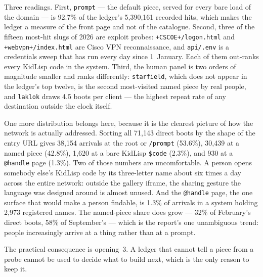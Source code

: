 \documentclass[10pt,letterpaper,twocolumn]{article}
\begin{document}
Three readings. First, \texttt{prompt} --- the default piece, served for
every bare load of the domain --- is 92.7\% of the ledger's 5,390,161
recorded hits, which makes the ledger a measure of the front page and
not of the catalogue. Second, three of the fifteen most-hit slugs of
2026 are exploit probes: \texttt{+CSCOE+/logon.html} and
\texttt{+webvpn+/index.html} are Cisco VPN reconnaissance, and
\texttt{api/.env} is a credentials sweep that has run every day since
1~January. Each of them out-ranks every KidLisp code in the system.
Third, the human panel is two orders of magnitude smaller and ranks
differently: \texttt{starfield}, which does not appear in the ledger's
top twelve, is the second most-visited named piece by real people, and
\texttt{laklok} draws 4.5 boots per client --- the highest repeat rate of
any destination outside the clock itself.

One more distribution belongs here, because it is the clearest picture
of how the network is actually addressed. Sorting all
71,143 direct boots by the shape of the entry URL gives 38,154
arrivals at the root or \texttt{/prompt} (53.6\%), 30,439 at a named
piece (42.8\%), 1,620 at a bare KidLisp \texttt{\$code} (2.3\%), and
930 at a \texttt{@handle} page (1.3\%). Two of those numbers are
uncomfortable. A person opens somebody else's KidLisp code by its
three-letter name about six times a day across the entire network:
outside the gallery iframe, the sharing gesture the language was
designed around is almost unused. And the \texttt{@handle} page, the
one surface that would make a person findable, is 1.3\% of arrivals in
a system holding 2,973 registered names. The named-piece share does
grow --- 32\% of February's direct boots, 58\% of September's --- which
is the report's one unambiguous trend: people increasingly arrive at a
thing rather than at a prompt.

The practical consequence is opening~3. A ledger that cannot tell a
piece from a probe cannot be used to decide what to build next, which
is the only reason to keep it.


\setlength{\bibsep}{1.2pt plus 0.2ex}
{\footnotesize

}
\end{document}
